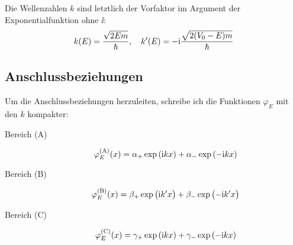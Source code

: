 Die Wellenzahlen $k$ sind letztlich der Vorfaktor im Argument der
Exponentialfunktion ohne $\ii$:
\[
	k(E) = \frac{\sqrt{2Em}}\hbar
	,\quad
	k'(E) = - \mathrm i \frac{\sqrt{2(V_0-E)m}}\hbar
\]

\subsection{Anschlussbeziehungen}

Um die Anschlussbeziehungen herzuleiten, schreibe ich die Funktionen
$\varphi_E$ mit den $k$ kompakter:

\begin{description}
	\item[Bereich (A)]
		\[
			\phiA(x) = \alpha_+ \exp\del{\ii k x}
			+ \alpha_- \exp\del{-\ii k x}
		\]

	\item[Bereich (B)]
		\[
			\phiB(x) = \beta_+ \exp\del{\ii k' x}
			+ \beta_- \exp\del{-\ii k' x}
		\]

	\item[Bereich (C)]
		\[
			\phiC(x) = \gamma_+ \exp\del{\ii k x}
			+ \gamma_- \exp\del{-\ii k x}
		\]
\end{description}

